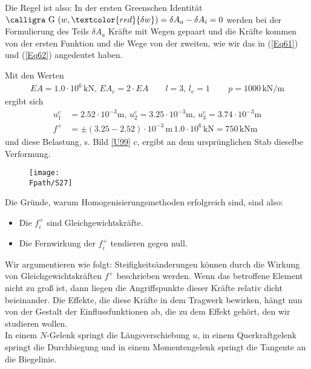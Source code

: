 {Die Regel ist also: In der ersten Greenschen Identit\"{a}t $\text{\normalfont\calligra G\,\,}(w,\textcolor{red}{\delta w}) = \delta A_a - \delta A_i = 0$ werden bei der Formulierung des Teils $\delta A_a$ Kr\"{a}fte mit Wegen gepaart und die Kr\"{a}fte kommen von der ersten Funktion und die Wege von der zweiten, wie wir das in (\ref{Eq61}) und (\ref{Eq62}) angedeutet haben.

Mit den Werten
\begin{align}
EA = 1.0 \cdot 10^6 \,\text{kN},\,EA_c = 2 \cdot EA\qquad  l = 3,\,l_e = 1\, \qquad p = 1000\,\text{kN}/\text{m}
\end{align}
ergibt sich
\begin{align}
u_1^c &= 2.52\cdot 10^{-3}\text{m},\,  u_2^c = 3.25 \cdot 10^{-3}\text{m},\,  u_3^c = 3.74 \cdot 10^{-3}\text{m} \\
 f^+ &= \pm (3.25 - 2.52)\cdot 10^{-3}\,\text{m} \,1.0\cdot 10^6\,\text{kN} = 750\,\text{kNm}
\end{align}
und diese Belastung, s. Bild \ref{U99} c, ergibt an dem urspr\"{u}nglichen Stab dieselbe Verformung.

\begin{figure}[tbp]
\centering
\texttt{[image: \\Fpath/S27]}

\label{S27}
%
\end{figure}%


Die Gr\"{u}nde, warum Homogenisierungsmethoden erfolgreich sind, sind also:
\begin{itemize}
  \item Die $f_i^+$ sind Gleichgewichtskr\"{a}fte.
  \item Die Fernwirkung der $f_i^+$ tendieren gegen null.
\end{itemize}

Wir argumentieren wie folgt: Steifigkeits\"{a}nderungen k\"{o}nnen durch die Wirkung von Gleichgewichtskr\"{a}ften $f^+$ beschrieben werden. Wenn das betroffene Element nicht zu gro{\ss} ist, dann liegen die Angriffspunkte dieser Kr\"{a}fte relativ dicht beieinander. Die Effekte, die diese Kr\"{a}fte in dem Trag\-werk  bewirken, h\"{a}ngt nun von der Gestalt der Einflussfunktionen ab, die zu dem Effekt geh\"{o}rt, den wir studieren wollen.\\

In einem $N$-Gelenk springt die L\"{a}ngsverschiebung $u$, in einem Querkraftgelenk springt die Durchbiegung und in einem Momentengelenk springt die Tangente an die Biegelinie.


}
